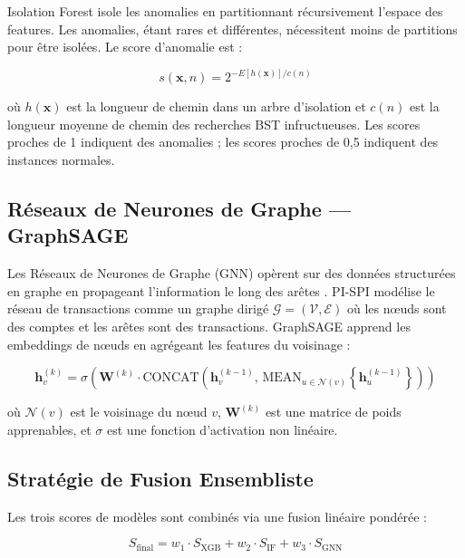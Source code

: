 \documentclass[12pt,a4paper,oneside]{book}
\theoremstyle{definition}
\theoremstyle{plain}
\begin{document}
Isolation Forest \citep{liu2008isolation} isole les anomalies en partitionnant récursivement l'espace des features. Les anomalies, étant rares et différentes, nécessitent moins de partitions pour être isolées. Le score d'anomalie est :

\begin{equation}
  s(\mathbf{x}, n) = 2^{-E[h(\mathbf{x})]/c(n)}
  \label{eq:iforest}
\end{equation}

où $h(\mathbf{x})$ est la longueur de chemin dans un arbre d'isolation et $c(n)$ est la longueur moyenne de chemin des recherches BST infructueuses. Les scores proches de 1 indiquent des anomalies ; les scores proches de 0,5 indiquent des instances normales.

\subsection{Réseaux de Neurones de Graphe — GraphSAGE}

Les Réseaux de Neurones de Graphe (GNN) opèrent sur des données structurées en graphe en propageant l'information le long des arêtes \citep{kipf2017semi}. PI-SPI modélise le réseau de transactions comme un graphe dirigé $\mathcal{G} = (\mathcal{V}, \mathcal{E})$ où les nœuds sont des comptes et les arêtes sont des transactions. GraphSAGE \citep{hamilton2017inductive} apprend les embeddings de nœuds en agrégeant les features du voisinage :

\begin{equation}
  \mathbf{h}_v^{(k)} = \sigma\!\left(\mathbf{W}^{(k)} \cdot \text{CONCAT}\!\left(\mathbf{h}_v^{(k-1)},\,
    \text{MEAN}_{u \in \mathcal{N}(v)}\!\left\{\mathbf{h}_u^{(k-1)}\right\}\right)\right)
  \label{eq:graphsage}
\end{equation}

où $\mathcal{N}(v)$ est le voisinage du nœud $v$, $\mathbf{W}^{(k)}$ est une matrice de poids apprenables, et $\sigma$ est une fonction d'activation non linéaire.

\subsection{Stratégie de Fusion Ensembliste}

Les trois scores de modèles sont combinés via une fusion linéaire pondérée :

\begin{equation}
  S_{\text{final}} = w_1 \cdot S_{\text{XGB}} + w_2 \cdot S_{\text{IF}} + w_3 \cdot S_{\text{GNN}}
  \label{eq:fusion}
\end{equation}
\end{document}
